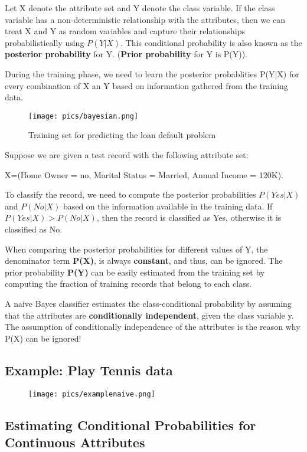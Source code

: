 		Let X denote the attribute set and Y denote the class variable. If the class variable
		has a non-deterministic relationship with the attributes, then we can treat X and Y
		as random variables and capture their relationships probabilistically using $P(Y|X)$.
		This conditional probability is also known as the {\bf posterior probability} for Y. 
		({\bf Prior probability} for Y is P(Y)).

		During the training phase, we need to learn the posterior probablities P(Y|X) for every
		combination of X an Y based on information gathered from the training data. 

		\begin{figure}[H]
			\centering
			\texttt{[image: pics/bayesian.png]}
			\caption{Training set for predicting the loan default problem}
		\end{figure}

		Suppose we are given a test record with the following attribute set:

		X=(Home Owner = no, Marital Status = Married, Annual Income = 120K).

		To classify the record, we need to compute the posterior probabilities
		$P(Yes|X)$ and $P(No|X)$ based on the information available in the training data.
		If $P(Yes|X) > P(No|X)$, then the record is classified as Yes, otherwise it is classified
		as No. 

		When comparing the posterior probabilities for different values of Y, the denominator term
		{\bf P(X)}, is always {\bf constant}, and thus, can be ignored. 
		The prior probability {\bf P(Y)} can be easily estimated from the training set by computing
		the fraction of training records that belong to each class.	

		A naive Bayes classifier estimates the class-conditional probability by assuming 
		that the attributes are {\bf conditionally independent}, given the class variable y. 
		The assumption of conditionally independence of the attributes is the reason why P(X)
		can be ignored!

		\subsection*{Example: Play Tennis data}

		\begin{figure}[H]
			\texttt{[image: pics/examplenaive.png]}
		\end{figure}

		\subsection{Estimating Conditional Probabilities for Continuous Attributes}

